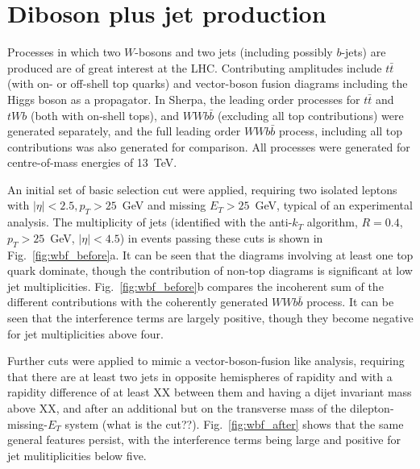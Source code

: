 \documentclass[11pt]{cernrep}
\begin{document}
\section{Diboson plus jet production}

Processes in which two $W$-bosons and two jets (including possibly $b$-jets) are produced are of great interest at the LHC. Contributing 
amplitudes include $t\bar{t}$ (with on- or off-shell top quarks) and vector-boson fusion diagrams including the Higgs boson as a propagator.
In Sherpa, the leading order processes for $t\bar{t}$ and $tWb$ (both with on-shell tops), and $WWb\bar{b}$ (excluding all top contributions) were generated separately, and the full leading order $WWb\bar{b}$ process, including all top contributions was also generated for 
comparison. All processes were generated for centre-of-mass energies of 13~TeV. 

An initial set of basic selection cut were applied, requiring two isolated leptons with $|\eta| < 2.5, p_T > 25$~GeV and missing $E_T > 25$~GeV, typical of an experimental analysis. The multiplicity of jets (identified with the anti-$k_T$ algorithm, $R=0.4$, 
$p_T > 25$~GeV, $|\eta| < 4.5$) in events passing these cuts is shown in Fig.~\ref{fig:wbf_before}a. It can be seen that the diagrams 
involving at least one top quark dominate, though the contribution of non-top diagrams is significant at low jet multiplicities.
Fig.~\ref{fig:wbf_before}b compares the incoherent sum of the different contributions with the coherently generated $WWb\bar{b}$ process. It
can be seen that the interference terms are largely positive, though they become negative for jet multiplicities above four.

Further cuts were applied to mimic a vector-boson-fusion like analysis, requiring that there are at least two jets in opposite hemispheres 
of rapidity and with a rapidity difference of at least XX between them and having a dijet invariant mass above XX, and after an additional but
on the transverse mass of the dilepton-missing-$E_T$ system (what is the cut??). Fig.~\ref{fig:wbf_after} shows that the same general features persist, with the interference terms being large and positive for jet mulitiplicities below five.
\end{document}
